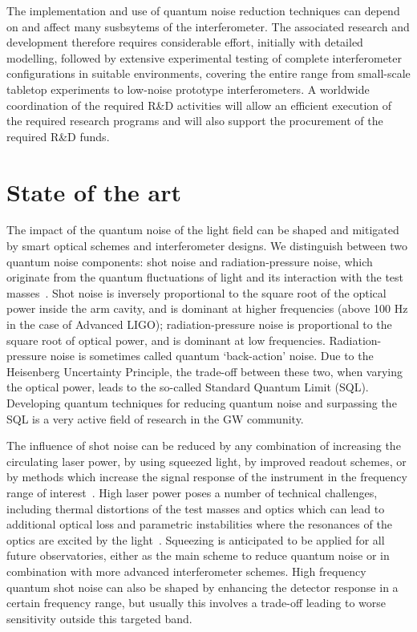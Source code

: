 The implementation and use of quantum noise reduction techniques can depend on and affect many susbsytems of the interferometer. The associated research and development therefore requires considerable effort, initially with detailed modelling, followed by extensive experimental testing of complete interferometer configurations in suitable environments, covering the entire range from small-scale tabletop experiments to low-noise prototype interferometers. A worldwide coordination of the required R\&D activities will allow an efficient execution of the required research programs and will also support the procurement of the required R\&D funds. 
 
\section{State of the art}
The impact of the quantum noise of the light field can be shaped and mitigated by smart optical schemes and interferometer designs. We distinguish between two quantum noise components: shot noise and radiation-pressure noise, which originate from the quantum fluctuations of light and its interaction with the test masses~\cite{Cav1980}. Shot noise is inversely proportional to the square root of the optical power inside the arm cavity, and is dominant at higher frequencies (above 100 Hz in the case of Advanced LIGO); radiation-pressure noise is proportional to the square root of optical power, and is dominant at low frequencies. Radiation-pressure noise is sometimes called quantum `back-action' noise. Due to the Heisenberg Uncertainty Principle, the trade-off between these two, when varying the optical power, leads to the so-called Standard Quantum Limit (SQL). Developing quantum techniques for reducing quantum noise and surpassing the SQL is a very active field of research in the GW community. 

The influence of shot noise can be reduced by any combination of increasing the circulating laser power, by using squeezed light, by improved readout schemes, or by methods which increase the signal response of the instrument in the frequency range of interest~\cite{StMe1991,Mizuno:RSE1993,Osamu:2006}. High laser power poses a number of technical challenges, including thermal distortions of the test masses and optics which can lead to additional optical loss and parametric instabilities where the resonances of the optics are excited by the light~\cite{BSV2001,Evans:2015raa}. Squeezing is anticipated to be applied for all future observatories, either as the main scheme to reduce quantum noise or in combination with more advanced interferometer schemes. High frequency quantum shot noise can also be shaped by enhancing the detector response in a certain frequency range, but usually this involves a trade-off leading to worse sensitivity outside this targeted band.  

